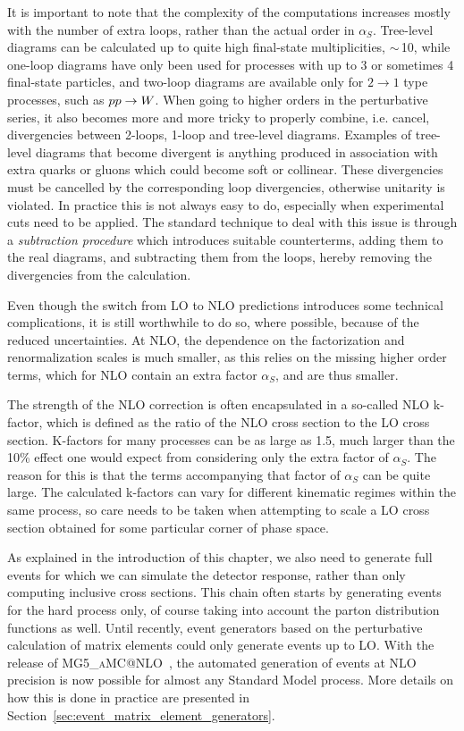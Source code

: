 It is important to note that the complexity of the computations increases mostly with the number of
extra loops, rather than the actual order in $\alpha_S$. 
Tree-level diagrams can be calculated up to quite high final-state multiplicities, $\sim\,$10,
while one-loop diagrams have only been used for processes with up to 3 or sometimes 4 final-state
particles, and two-loop diagrams are available only for $2 \rightarrow 1$ type processes, such as
${p}{p} \rightarrow W$.
When going to higher orders in the perturbative series, it also becomes more and more tricky to
properly combine, i.e. cancel, divergencies between 2-loops, 1-loop and tree-level diagrams. 
Examples of tree-level diagrams that become divergent is anything produced in association with
extra quarks or gluons which could become soft or collinear. These divergencies must be cancelled
by the corresponding loop divergencies, otherwise unitarity is violated. 
In practice this is not always easy to do, especially when experimental cuts need to be applied. 
The standard technique to deal with this issue is through a \textit{subtraction procedure} which
introduces suitable counterterms, adding them to the real diagrams, and subtracting them from the
loops, hereby removing the divergencies from the calculation.


Even though the switch from LO to NLO predictions introduces some technical complications, it is
still worthwhile to do so, where possible, because of the reduced uncertainties. 
At NLO, the dependence on the factorization and renormalization scales is much smaller, as this
relies on the missing higher order terms, which for NLO contain an extra factor $\alpha_S$, and are
thus smaller.

The strength of the NLO correction is often encapsulated in a so-called NLO k-factor, which is
defined as the ratio of the NLO cross section to the LO cross section. K-factors for many processes
can be as large as 1.5, much larger than the 10\% effect one would expect from considering only the
extra factor of $\alpha_S$. The reason for this is that the terms accompanying that factor of
$\alpha_S$ can be quite large. 
The calculated k-factors can vary for different kinematic regimes within the same process, so care
needs to be taken when attempting to scale a LO cross section obtained for some particular corner of
phase space. 


As explained in the introduction of this chapter, we also need to generate full events for
which we can simulate the detector response, rather than only computing inclusive cross sections.
This chain often starts by generating events for the hard process only, of course taking into
account the parton distribution functions as well. 
Until recently, event generators based on the perturbative calculation of matrix elements could only
generate events up to LO. 
With the release of \textsc{MG5\_aMC@NLO}~\cite{Alwall:2014hca}, the automated generation of events
at NLO precision is now possible for almost any Standard Model process.
More details on how this is done in practice are presented in
Section~\ref{sec:event_matrix_element_generators}.



